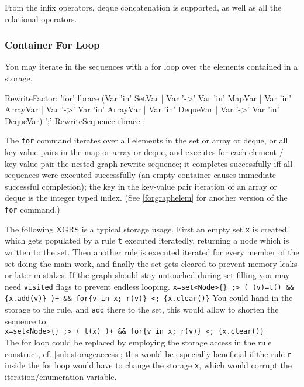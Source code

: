 From the infix operators, deque concatenation is supported, as well as all the relational operators.

\subsubsection*{Container For Loop}

You may iterate in the sequences with a for loop over the elements contained in a storage.

\begin{rail}
  RewriteFactor:
    'for' lbrace (Var 'in' SetVar | Var '->' Var 'in' MapVar | Var 'in' ArrayVar | Var '->' Var 'in' ArrayVar | Var 'in' DequeVar | Var '->' Var 'in' DequeVar) ';' RewriteSequence rbrace
    ;
\end{rail}\label{forstorage}

The \texttt{for} command iterates over all elements in the set or array or deque, or all key-value pairs in the map or array or deque, and executes for each element / key-value pair the nested graph rewrite sequence; it completes successfully iff all sequences were executed successfully (an empty container causes immediate successful completion); the key in the key-value pair iteration of an array or deque is the integer typed index. (See \ref{forgraphelem} for another version of the \texttt{for} command.)

\begin{example}
The following XGRS is a typical storage usage.
First an empty set \texttt{x} is created, which gets populated by a rule \texttt{t} executed iteratedly, returning a node which is written to the set.
Then another rule is executed iterated for every member of the set doing the main work, and finally the set gets cleared to prevent memory leaks or later mistakes.
If the graph should stay untouched during set filling you may need \texttt{visited} flags to prevent endless looping.
\verb#x=set<Node>{} ;> ( (v)=t() && {x.add(v)} )+ && for{v in x; r(v)} <; {x.clear()}#
You could hand in the storage to the rule, and \texttt{add} there to the set, this would allow to shorten the sequence to:\\
\verb#x=set<Node>{} ;> ( t(x) )+ && for{v in x; r(v)} <; {x.clear()}#\\
The for loop could be replaced by employing the storage access in the rule construct, cf. \ref{sub:storageaccess}; this would be especially beneficial if the rule \texttt{r} inside the for loop would have to change the storage \texttt{x}, which would corrupt the iteration/enumeration variable.
\end{example}

